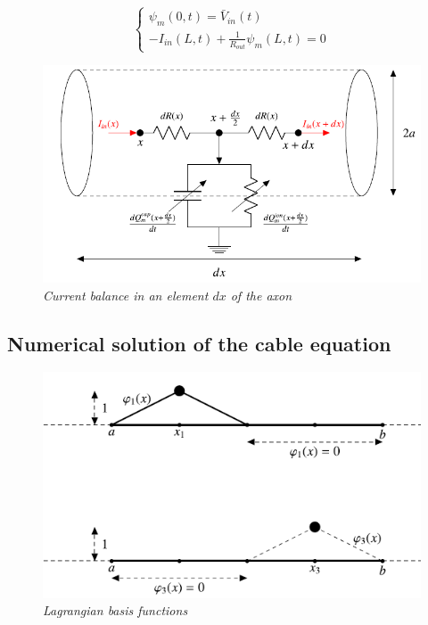 \documentclass[a4paper]{article}
\begin{document}
\begin{equation}
\begin{cases}
\psi_m(0,t) = \bar{V}_{in}(t) \\
-I_{in}(L,t) +\frac{1}{R_{out}}\psi_m(L,t) =0
\end{cases}
\end{equation}

\begin{figure}[H]
	\begin{center}
		
		\includegraphics[scale=0.5]{curr_bal.png} 
	\end{center} 
	\caption{\textit{Current balance in an element $dx$ of the axon}}
	
\end{figure}

\subsection{Numerical solution of the cable equation}


\begin{figure}[H]
	\begin{center}
		
		\includegraphics[scale=0.7]{basis.png} 
	\end{center} 
	\caption{\textit{Lagrangian basis functions}}
	
\end{figure}
\end{document}
